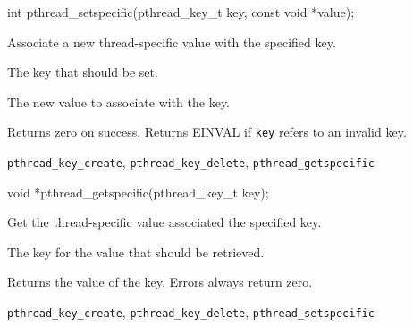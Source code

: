 \begin{apisyn}

	\funcproto int pthread_setspecific(pthread_key_t key,
                                           const void *value);
\end{apisyn}
\begin{apidesc}
	Associate a new thread-specific value with the specified key.
\end{apidesc}
\begin{apiparm}
	\item[key]
		The key that should be set.
	\item[value]
		The new value to associate with the key.
\end{apiparm}
\begin{apiret}
	Returns zero on success. Returns EINVAL if {\tt key} refers to an
	invalid key.
\end{apiret}
\begin{apirel}
	{\tt pthread_key_create}, {\tt pthread_key_delete},
	{\tt pthread_getspecific}
\end{apirel}


\begin{apisyn}

	\funcproto void *pthread_getspecific(pthread_key_t key);
\end{apisyn}
\begin{apidesc}
	Get the thread-specific value associated the specified key.
\end{apidesc}
\begin{apiparm}
	\item[key]
		The key for the value that should be retrieved.
\end{apiparm}
\begin{apiret}
	Returns the value of the key. Errors always return zero.
\end{apiret}
\begin{apirel}
	{\tt pthread_key_create}, {\tt pthread_key_delete},
	{\tt pthread_setspecific}
\end{apirel}


